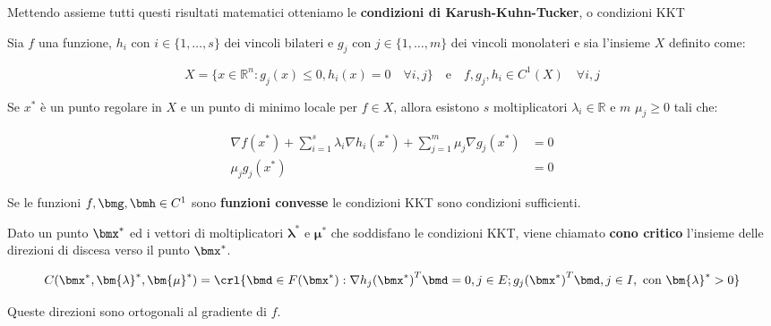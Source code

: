 \documentclass[\main/main.tex]{subfiles}
\begin{document}
Mettendo assieme tutti questi risultati matematici otteniamo le \textbf{condizioni di Karush-Kuhn-Tucker}, o condizioni KKT\@

\begin{theorem}
	Sia \(f \) una funzione, \(h_i \text{ con } i \in \{1, \ldots, s\}\) dei vincoli bilateri e \(g_j \text{ con } j \in \{1, \ldots, m\}\) dei vincoli monolateri e sia l'insieme $X$ definito come:

	\[
		X  = \{x \in \mathbb{R}^n: g_j(x) \leq 0, h_i(x) = 0 \quad \forall i, j \} \quad \text{e} \quad f, g_j, h_i \in C^1(X) \quad \forall i,j
	\]

	Se $x^*$ è un punto regolare in $X$ e un punto di minimo locale per \(f \in X\), allora esistono $s$ moltiplicatori $\lambda_i \in \mathbb{R}$ e $m$ $\mu_j \geq 0$ tali che:

	\begin{align*}
		\nabla f(x^*) + \sum_{i=1}^s \lambda_i \nabla h_i(x^*) + \sum_{j=1}^m \mu_j \nabla g_j(x^*) & = 0 \\
		\mu_j g_j(x^*)                                                                              & = 0
	\end{align*}
\end{theorem}

\begin{theorem}
	Se le funzioni \(f, \bmg, \bmh \in C^1\) sono \textbf{funzioni convesse} le condizioni KKT sono condizioni sufficienti.
\end{theorem}

\begin{definition}
	Dato un punto \(\bmx^*\) ed i vettori di moltiplicatori \(\bm{\lambda}^*\) e \(\bm{\mu}^*\) che soddisfano le condizioni KKT, viene chiamato \textbf{cono critico} l'insieme delle direzioni di discesa verso il punto \(\bmx^*\).

	\[
		C(\bmx^*, \bm{\lambda}^*, \bm{\mu}^*) = \crl{\bmd \in F(\bmx^*) : \nabla {h_j(\bmx^*)}^T\bmd = 0, j \in E; {g_j(\bmx^*)}^T\bmd, j \in I, \text{ con }\bm{\lambda}^*>0}
	\]

	Queste direzioni sono ortogonali al gradiente di \(f\).
\end{definition}
\end{document}
